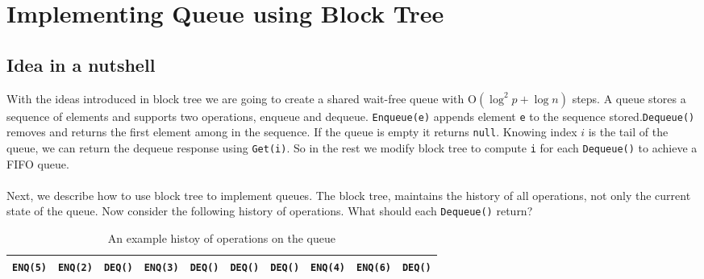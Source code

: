 \documentclass[10pt]{article}
\newcommand\keywordfont{\sffamily\bfseries}
\theoremstyle{definition}
\begin{document}
\begin{algorithm}
\begin{algorithmic}[1]
\Statex

%
%

\end{algorithmic}
\end{algorithm}

\section{Implementing Queue using Block Tree}
\subsection{Idea in a nutshell}
With the ideas introduced in block tree we are going to create a shared wait-free queue with \textsc{O}$(\log ^2p+\log n)$ steps. A queue stores a sequence of elements and supports two operations, enqueue and dequeue. \texttt{Enqueue(e)} appends element \texttt{e} to the sequence stored.\texttt{Dequeue()} removes and returns the first element among in the sequence. If the queue is empty it returns \texttt{null}. Knowing index $i$ is the tail of the queue, we can return the dequeue response using \texttt{Get(i)}.  So in the rest we modify block tree to compute \texttt{i} for each \texttt{Dequeue()} to achieve a FIFO queue.
%
\paragraph{}
Next, we describe how to use block tree to implement queues. The block tree, maintains the history of all operations, not only the current state of the queue. Now consider the following history of operations. What should each \texttt{Dequeue()} return?

\begin{table}[hbt]
\centering
  \begin{tabular}{c|c|c|c|c|c|c|c|c|c}
    \hline \texttt{ENQ(5)}& \texttt{ENQ(2)}& \texttt{DEQ()}& \texttt{ENQ(3)}&\texttt{DEQ()}& \texttt{DEQ()}& \texttt{DEQ()}& \texttt{ENQ(4)}& \texttt{ENQ(6)}& \texttt{DEQ()}\\ \hline
  \end{tabular}
  \caption{An example histoy of operations on the queue}
\end{table}
\end{document}
